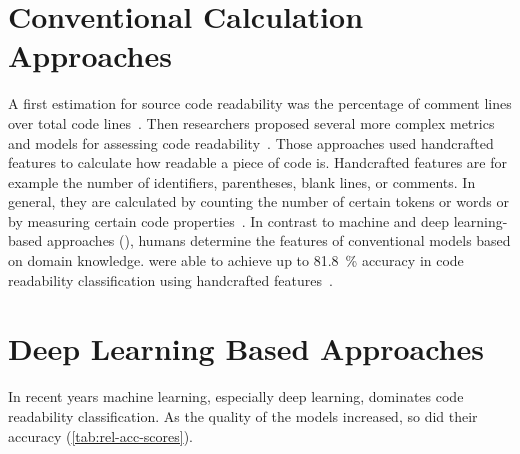 \documentclass[%
class=scrreprt,
chapterprefix=false,%
open=right,%
twoside=true,%
paper=a4,%
logofile={Logo\_zentral\_farbig\_EN.png},%
thesistype=master,%
UKenglish,%
]{se2thesis}
\theoremstyle{definition}
\begin{document}
	
\section{Conventional Calculation Approaches} \label{Conventional Calculation Approaches}
	A first estimation for source code readability was the percentage of comment lines over total code lines~\cite{aggarwal2002integrated}. Then researchers proposed several more complex metrics and models for assessing code readability~\cite{buse2009learning, posnett2011simpler, dorn2012general, scalabrino2018comprehensive}.
	Those approaches used handcrafted features to calculate how readable a piece of code is.
	Handcrafted features are for example the number of identifiers, parentheses, blank lines, or comments. In general, they are calculated by counting the number of certain tokens or words or by measuring certain code properties~\cite{scalabrino2018comprehensive}.
	In contrast to machine and deep learning-based approaches (), humans determine the features of conventional models based on domain knowledge.
	\citeauthor{scalabrino2018comprehensive} were able to achieve up to 81.8~\% accuracy in code readability classification using handcrafted features~\cite{scalabrino2018comprehensive}.
	
\section{Deep Learning Based Approaches} \label{Deep Learning Based Approaches}
	In recent years machine learning, especially deep learning, dominates code readability classification. As the quality of the models increased, so did their accuracy (\autoref{tab:rel-acc-scores}).
	
\end{document}

